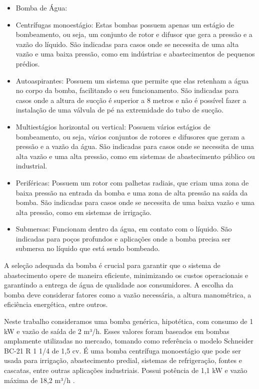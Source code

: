 \begin{itemize}
\item[] Bomba de Água:
\item[-] Centrífugas monoestágio: Estas bombas possuem apenas um estágio de bombeamento, ou seja, um conjunto de rotor e difusor que gera a pressão e a vazão do líquido. São indicadas para casos onde se necessita de uma alta vazão e uma baixa pressão, como em indústrias e abastecimentos de pequenos prédios. 

\item[-] Autoaspirantes: Possuem um sistema que permite que elas retenham a água no corpo da bomba, facilitando o seu funcionamento. São indicadas para casos onde a altura de sucção é superior a 8 metros e não é possível fazer a instalação de uma válvula de pé na extremidade do tubo de sucção. 

\item[-] Multiestágios horizontal ou vertical: Possuem vários estágios de bombeamento, ou seja, vários conjuntos de rotores e difusores que geram a pressão e a vazão da água. São indicadas para casos onde se necessita de uma alta vazão e uma alta pressão, como em sistemas de abastecimento público ou industrial. 

\item[-] Periféricas: Possuem um rotor com palhetas radiais, que criam uma zona de baixa pressão na entrada da bomba e uma zona de alta pressão na saída da bomba. São indicadas para casos onde se necessita de uma baixa vazão e uma alta pressão, como em sistemas de irrigação. 

\item[-] Submersas: Funcionam dentro da água, em contato com o líquido. São indicadas para poços profundos e aplicações onde a bomba precisa ser submersa no líquido que está sendo bombeado. 
\end{itemize}
    
A seleção adequada da bomba é crucial para garantir que o sistema de abastecimento opere de maneira eficiente, minimizando os custos operacionais e garantindo a entrega de água de qualidade aos consumidores. A escolha da bomba deve considerar fatores como a vazão necessária, a altura manométrica, a eficiência energética, entre outros. 

Neste trabalho consideramos uma bomba genérica, hipotética, com consumo de 1 kW e vazão de saída de 2 m³/h. Esses valores foram baseados em bombas amplamente utilizadas no mercado, tomando como referência o modelo Schneider BC-21 R 1 1/4 de 1,5 cv. É uma bomba centrífuga monoestágio que pode ser usada para irrigação, abastecimento predial, sistemas de refrigeração, fontes e cascatas, entre outras aplicações industriais. Possui potência de 1,1 kW e vazão máxima de 18,2 m³/h \cite{Schneider}.


